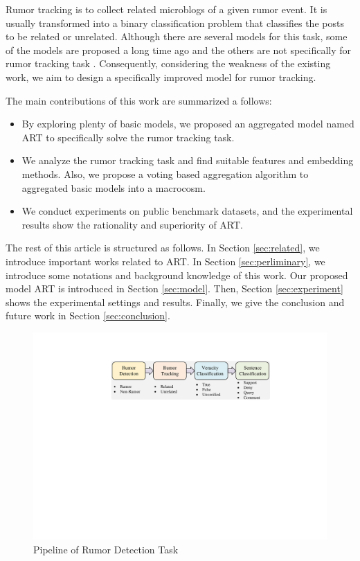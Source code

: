 Rumor tracking is to collect related microblogs of a given rumor event. It is usually transformed into a binary classification problem that classifies the posts to be related or unrelated. Although there are several models for this task, some of the models are proposed a long time ago \cite{DBLP:conf/emnlp/QazvinianRRM11} and the others are not specifically for rumor tracking task \cite{DBLP:conf/www/ChengNB20}.
Consequently, considering the weakness of the existing work, we aim to design a specifically improved model for rumor tracking. 

The main contributions of this work are summarized a follows:
\begin{itemize}
	\item By exploring plenty of basic models, we proposed an aggregated model named ART to specifically solve the rumor tracking task. 
	\item We analyze the rumor tracking task and find suitable features and embedding methods. Also, we propose a voting based aggregation algorithm to aggregated basic models into a macrocosm.
	\item We conduct experiments on public benchmark datasets, and the experimental results show the rationality and superiority of ART.
\end{itemize}

The rest of this article is structured as follows. In Section \ref{sec:related}, we introduce important works related to ART. In Section \ref{sec:perliminary}, we introduce some notations and background knowledge of this work. Our proposed model ART is introduced in Section \ref{sec:model}. Then, Section \ref{sec:experiment} shows the experimental settings and results. Finally, we give the conclusion and future work in Section \ref{sec:conclusion}.

\begin{figure}[tbp]
	\hspace{0ex}
	\vspace{0ex}
	\centering
	\includegraphics[width = \textwidth]{fig/pipeline}
	\caption{Pipeline of Rumor Detection Task}
	\label{fig:pipeline}
\end{figure}